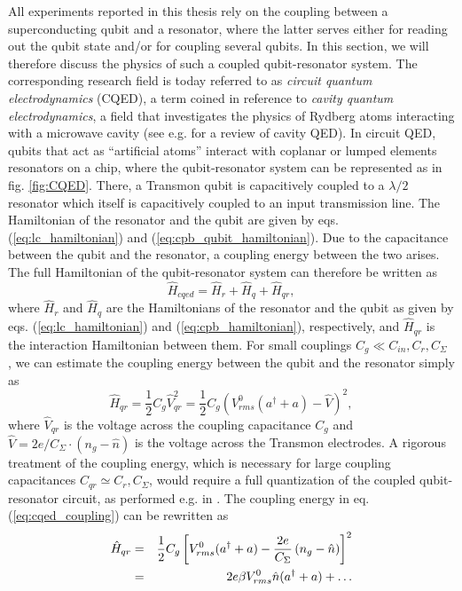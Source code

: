 All experiments reported in this thesis rely on the coupling between a superconducting qubit and a resonator, where the latter serves either for reading out the qubit state and/or for coupling several qubits. In this section, we will therefore discuss the physics of such a coupled qubit-resonator system. The corresponding research field is today referred to as {\it circuit quantum electrodynamics} (CQED), a term coined in reference to {\it cavity quantum electrodynamics}, a field that investigates the physics of Rydberg atoms interacting with a microwave cavity (see e.g. \citep{mabuchi_cavity_2002,walther_cavity_2006} for a review of cavity QED). In circuit QED, qubits that act as ``artificial atoms'' interact with coplanar or lumped elements resonators on a chip, where the qubit-resonator system can be represented as in fig. \ref{fig:CQED}. There, a Transmon qubit is capacitively coupled to a $\lambda/2$ resonator which itself is capacitively coupled to an input transmission line. The Hamiltonian of the resonator and the qubit are given by eqs. (\ref{eq:lc_hamiltonian}) and (\ref{eq:cpb_qubit_hamiltonian}). Due to the capacitance between the qubit and the resonator, a coupling energy between the two arises. The full Hamiltonian of the qubit-resonator system can therefore be written as
%
\begin{equation}
\hat{H}_{cqed} = \hat{H}_r+\hat{H}_q+\hat{H}_{qr},
\end{equation}
%
where $\hat{H}_{r}$ and $\hat{H}_q$ are the Hamiltonians of the resonator and the qubit as given by eqs. (\ref{eq:lc_hamiltonian}) and (\ref{eq:cpb_hamiltonian}), respectively, and $\hat{H}_{qr}$ is the interaction Hamiltonian between them. For small couplings $C_g \ll C_{in},C_r,C_\Sigma$ , we can estimate the coupling energy between the qubit and the resonator simply as
%
\begin{equation}
\hat{H}_{qr} = \frac{1}{2}C_{g}\hat{V}_{qr}^2 = \frac{1}{2}C_g\left(V^0_{rms}(a^\dagger+a)-\hat{V}\right)^2, \label{eq:cqed_coupling}
\end{equation}
%
where $\hat{V}_{qr}$ is the voltage across the coupling capacitance $C_g$ and $\hat{V}=2e/C_\Sigma \cdot(n_g-\hat{n})$ is the voltage across the Transmon electrodes. A rigorous treatment of the coupling energy, which is necessary for large coupling capacitances $C_{qr}\simeq C_{r},C_\Sigma$, would require a full quantization of the coupled qubit-resonator circuit, as performed e.g. in \citep{nguyen_cooper_2008}. The coupling energy in eq. (\ref{eq:cqed_coupling}) can be rewritten as
%
\begin{eqnarray}
\hat{H}_{qr} & = & \frac{1}{2}C_g\left[V_{rms}^0(a^\dagger+a)-\frac{2e}{C_\Sigma}\left(n_g-\hat{n}\right)\right]^2 \notag \\
       & = & 2e \beta V_{rms}^0\hat{n}(a^\dagger+a) + \hdots \label{eq:cqed_coupling}
\end{eqnarray}
